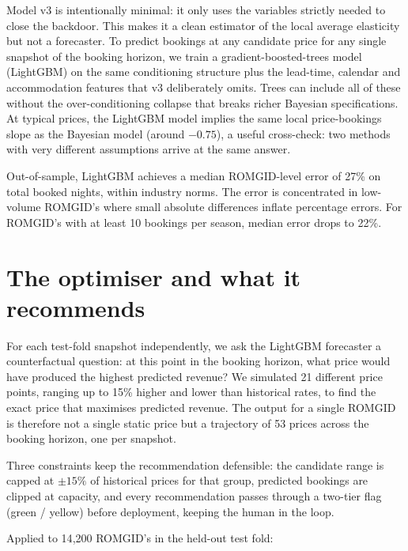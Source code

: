 \documentclass[11pt,a4paper]{article}
\begin{document}
Model v3 is intentionally minimal: it only uses the variables strictly needed to close the backdoor. This makes it a clean estimator of the local average elasticity but not a forecaster. To predict bookings at any candidate price for any single snapshot of the booking horizon, we train a gradient-boosted-trees model (LightGBM) on the same conditioning structure plus the lead-time, calendar and accommodation features that v3 deliberately omits. Trees can include all of these without the over-conditioning collapse that breaks richer Bayesian specifications. At typical prices, the LightGBM model implies the same local price-bookings slope as the Bayesian model (around $-0.75$), a useful cross-check: two methods with very different assumptions arrive at the same answer.

Out-of-sample, LightGBM achieves a median ROMGID-level error of 27\% on total booked nights, within industry norms. The error is concentrated in low-volume ROMGID's where small absolute differences inflate percentage errors. For ROMGID's with at least 10 bookings per season, median error drops to 22\%.

\section{The optimiser and what it recommends}

For each test-fold snapshot independently, we ask the LightGBM forecaster a counterfactual question: at this point in the booking horizon, what price would have produced the highest predicted revenue? We simulated 21 different price points, ranging up to 15\% higher and lower than historical rates, to find the exact price that maximises predicted revenue. The output for a single ROMGID is therefore not a single static price but a trajectory of 53 prices across the booking horizon, one per snapshot.

Three constraints keep the recommendation defensible: the candidate range is capped at $\pm 15\%$ of historical prices for that group, predicted bookings are clipped at capacity, and every recommendation passes through a two-tier flag (green / yellow) before deployment, keeping the human in the loop.

\newpage Applied to 14{,}200 ROMGID's in the held-out test fold:
\end{document}
